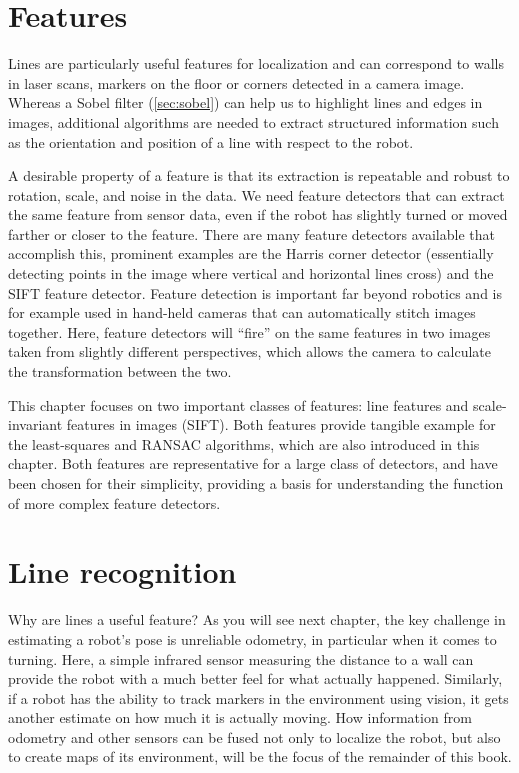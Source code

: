 \section{Features}
Lines are particularly useful features for localization and can correspond to walls in laser scans, markers on the floor or corners detected in a camera image. Whereas a Sobel filter (\cref{sec:sobel}) can help us to highlight lines and edges in images, additional algorithms are needed to extract structured information such as the orientation and position of a line with respect to the robot.

A desirable property of a feature is that its extraction is repeatable and robust to rotation, scale, and noise in the data. We need feature detectors that can extract the same feature from sensor data, even if the robot has slightly turned or moved farther or closer to the feature. There are many feature detectors available that accomplish this, prominent examples are the Harris corner detector (essentially detecting points in the image where vertical and horizontal lines cross) and the SIFT feature detector. Feature detection is important far beyond robotics and is for example used in hand-held cameras that can automatically stitch images together. Here, feature detectors will ``fire'' on the same features in two images taken from slightly different perspectives, which allows the camera to calculate the transformation between the two.

This chapter focuses on two important classes of features: line features and scale-invariant features in images (SIFT). Both features provide tangible example for the least-squares and RANSAC algorithms, which are also introduced in this chapter. Both features are representative for a large class of detectors, and have been chosen for their simplicity, providing a basis for understanding the function of more complex feature detectors.

\section{Line recognition}
Why are lines a useful feature? As you will see next chapter, the key challenge in estimating a robot's pose is unreliable odometry, in particular when it comes to turning. Here, a simple infrared sensor measuring the distance to a wall can provide the robot with a much better feel for what actually happened. Similarly, if a robot has the ability to track markers in the environment using vision, it gets another estimate on how much it is actually moving. How information from odometry and other sensors can be fused not only to localize the robot, but also to create maps of its environment, will be the focus of the remainder of this book.

